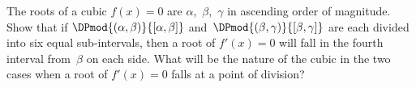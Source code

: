 The roots of a cubic $f(x) = 0$ are $\alpha$,~$\beta$,~$\gamma$ in ascending order of magnitude.
Show that if $\DPmod{(\alpha, \beta)}{[\alpha, \beta]}$ and~$\DPmod{(\beta, \gamma)}{[\beta, \gamma]}$ are each divided into six equal sub-intervals,
then a root of $f'(x) = 0$ will fall in the fourth interval from~$\beta$ on each side.
What will be the nature of the cubic in the two cases when a root of $f'(x) = 0$
falls at a point of division? 


